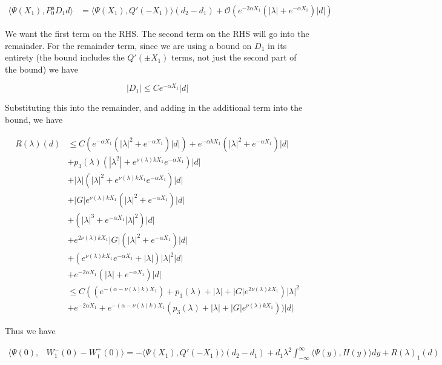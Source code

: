 \documentclass[12pt]{article}
\begin{document}
\begin{enumerate}
\begin{align*}
\langle \Psi(X_1), P^u_0 D_1 d \rangle &= \langle \Psi(X_1), Q'(-X_1) \rangle (d_2 - d_1 ) + \mathcal{O} \left( e^{-2 \alpha X_1} \left( |\lambda| +  e^{-\alpha X_1}  \right) |d| \right)
\end{align*}

We want the first term on the RHS. The second term on the RHS will go into the remainder. For the remainder term, since we are using a bound on $D_1$ in its entirety (the bound includes the $Q'(\pm X_1)$ terms, not just the second part of the bound) we have

\[
|D_1| \leq C e^{-\alpha X_1}|d|
\]

Substituting this into the remainder, and adding in the additional term into the bound, we have

\begin{align*}
R(\lambda)(d) &\leq C( e^{-\alpha X_1}( |\lambda|^2 + e^{-\alpha X_1})|d|) + e^{-\alpha k X_1} ( |\lambda|^2 + e^{-\alpha X_1}) |d| \\
&+ p_3(\lambda) (|\lambda^2| + e^{\nu(\lambda)k X_1}e^{-\alpha X_1})|d| \\
&+ |\lambda| (|\lambda|^2 + e^{\nu(\lambda)k X_1} e^{-\alpha X_1})|d| \\
&+ |G| e^{\nu(\lambda)k X_1} ( |\lambda|^2 + e^{-\alpha X_1} )|d| \\ 
&+ (|\lambda|^3 + e^{-\alpha X_1} |\lambda|^2 )|d| \\
&+ e^{2 \nu(\lambda) k X_1} |G| ( |\lambda|^2 + e^{-\alpha X_1} )|d| \\
&+ (e^{\nu(\lambda)k X_1} e^{-\alpha X_1} + |\lambda|)|\lambda|^2|d|\\
&+ e^{-2 \alpha X_1} \left( |\lambda| +  e^{-\alpha X_1}  \right) |d|\\
&\leq C( ( e^{-(\alpha - \nu(\lambda) k)X_1 }) + p_3(\lambda) + |\lambda| + |G|e^{2 \nu(\lambda) k X_1})|\lambda|^2 \\ 
&+ e^{-2 \alpha X_1} + e^{-(\alpha - \nu(\lambda) k)X_1 }(p_3(\lambda) + |\lambda| + |G| e^{\nu(\lambda)k X_1}))|d|
\end{align*}

Thus we have 

\begin{align*}
\langle \Psi(0), &W_1^-(0) - W_1^+(0) \rangle = 
-\langle \Psi(X_1), Q'(-X_1) \rangle (d_2 - d_1 ) + d_1 \lambda^2 \int_{-\infty}^\infty \langle \Psi(y), H(y) \rangle dy + R(\lambda)_1(d)
\end{align*}


\end{enumerate}
\end{document}
